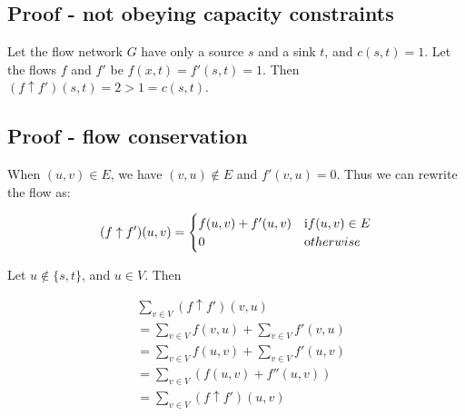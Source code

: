 \documentclass[12pt]{article}
\begin{document}
\subsection{Proof - not obeying capacity constraints}
Let the flow network $G$ have only a source $s$ and a sink $t$, and $c(s,t) = 1$. Let the flows $f$ and $f'$ be $f(x,t) = f'(s,t) = 1$. Then $(f \uparrow f')(s,t) = 2 >1 = c(s,t)$.

\subsection{Proof - flow conservation}
When $(u,v) \in E$, we have $(v,u) \notin E$ and $f'(v,u) = 0$. Thus we can rewrite the flow as:

\begin{equation}
(f \uparrow f')(u,v) = 
\begin{cases}
f(u,v) + f'(u,v) &\mbox if (u,v) \in E\\
0 &\mbox otherwise
\end{cases}
\end{equation}

Let $u \notin \{s,t\}$, and $u \in V$. Then

\begin{equation}
\begin{aligned}
&\sum_{v \in V} (f \uparrow f')(v,u)\\
&=\sum_{v \in V} f(v,u) + \sum_{v \in V} f'(v,u)\\
&=\sum_{v \in V} f(u,v) + \sum_{v \in V} f'(u,v)\\
&=\sum_{v \in V} (f(u,v) + f''(u,v))\\
&=\sum_{v \in V} (f \uparrow f')(u,v)\\
\end{aligned}
\end{equation}
\end{document}
